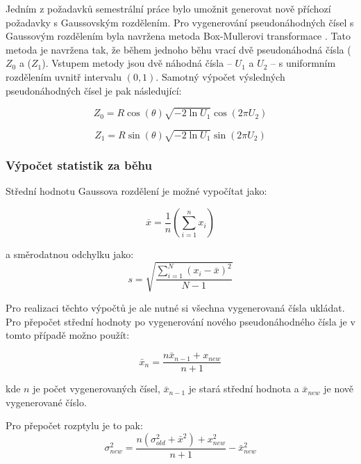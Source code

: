 \documentclass{article}
\begin{document}
Jedním z požadavků semestrální práce bylo umožnit generovat nově příchozí požadavky s Gaussovským rozdělením.
Pro vygenerování pseudonáhodných čísel s Gaussovým rozdělením byla navržena metoda Box-Mullerovi transformace \cite{box1958note}.
Tato metoda je navržena tak, že během jednoho běhu vrací dvě pseudonáhodná čísla (\( Z_0 \) a (\( Z_1 \)). 
Vstupem metody jsou dvě náhodná čísla -- \( U_1 \) a \( U_2 \) -- s uniformním rozdělením uvnitř intervalu \( (0,1) \).
Samotný výpočet výsledných pseudonáhodných čísel je pak následující:


\begin{equation} 
Z_0 = R\cos{(\theta)} \sqrt{-2\ln{U_1}}\cos{(2\pi U_2)}
\end{equation}

\begin{equation} 
Z_1 = R\sin{(\theta)} \sqrt{-2\ln{U_1}}\sin{(2\pi U_2)}
\end{equation}


\subsubsection{Výpočet statistik za běhu}

Střední hodnotu Gaussova rozdělení je možné vypočítat jako:

\begin{equation} 
\overline{x} = \frac{1}{n}(\sum_{i=1}^{n}x_i)
\end{equation}

a směrodatnou odchylku jako:
\begin{equation} 
s = \sqrt{\frac{\sum_{i=1}^{N}(x_i - \bar{x})^2}{N - 1}}
\end{equation}

Pro realizaci těchto výpočtů je ale nutné si všechna vygenerovaná čísla ukládat.
Pro přepočet střední hodnoty po vygenerování nového pseudonáhodného čísla je v tomto případě možno použít:

\begin{equation} 
\bar{x}_n = \frac{n\bar{x}_{n-1} + x_{new}}{n+1}
\end{equation}

kde \( n \) je počet vygenerovaných čísel, \( \bar{x}_{n-1} \) je stará střední hodnota a \( \bar{x}_{new} \)  je nově vygenerované číslo.

Pro přepočet rozptylu je to pak:
\begin{equation} 
\sigma^{2}_{new} = \frac{n(\sigma^{2}_{old}+ \bar{x}^2) + x^{2}_{new}}{n+1} - \bar{x}^{2}_{new} 
\end{equation}
\end{document}
